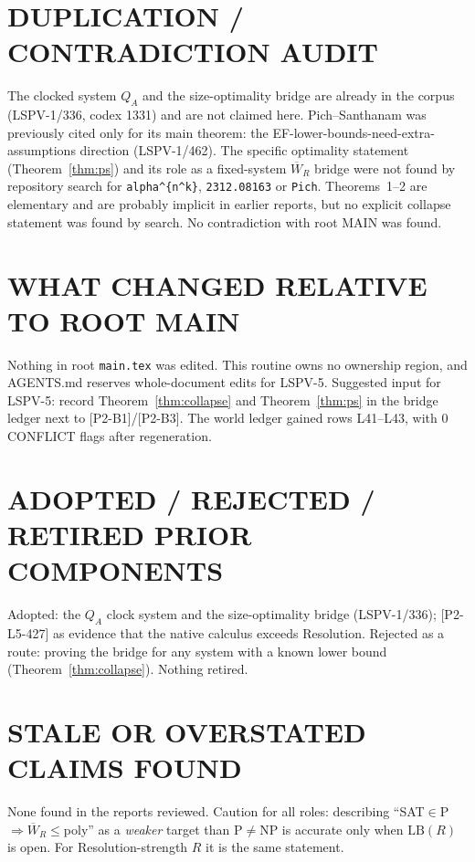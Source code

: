 \documentclass[11pt]{article}
\theoremstyle{definition}
\newcommand{\Wb}{\overline W}
\begin{document}
\section*{DUPLICATION / CONTRADICTION AUDIT}
The clocked system $Q_A$ and the size-optimality bridge are already in the corpus (LSPV-1/336, codex 1331) and are not claimed here. Pich--Santhanam was previously cited only for its main theorem: the EF-lower-bounds-need-extra-assumptions direction (LSPV-1/462). The specific optimality statement (Theorem~\ref{thm:ps}) and its role as a fixed-system $\Wb_R$ bridge were not found by repository search for \texttt{alpha\^{}\{n\^{}k\}}, \texttt{2312.08163} or \texttt{Pich}. Theorems~1--2 are elementary and are probably implicit in earlier reports, but no explicit collapse statement was found by search. No contradiction with root MAIN was found.

\section*{WHAT CHANGED RELATIVE TO ROOT MAIN}
Nothing in root \texttt{main.tex} was edited. This routine owns no ownership region, and AGENTS.md reserves whole-document edits for LSPV-5. Suggested input for LSPV-5: record Theorem~\ref{thm:collapse} and Theorem~\ref{thm:ps} in the bridge ledger next to [P2-B1]/[P2-B3]. The world ledger gained rows L41--L43, with 0 CONFLICT flags after regeneration.

\section*{ADOPTED / REJECTED / RETIRED PRIOR COMPONENTS}
Adopted: the $Q_A$ clock system and the size-optimality bridge (LSPV-1/336); [P2-L5-427] as evidence that the native calculus exceeds Resolution.
Rejected as a route: proving the bridge for any system with a known lower bound (Theorem~\ref{thm:collapse}).
Nothing retired.

\section*{STALE OR OVERSTATED CLAIMS FOUND}
None found in the reports reviewed. Caution for all roles: describing ``SAT$\in$P$\Rightarrow\Wb_R\le$poly'' as a \emph{weaker} target than P$\ne$NP is accurate only when $\mathrm{LB}(R)$ is open. For Resolution-strength $R$ it is the same statement.
\end{document}
